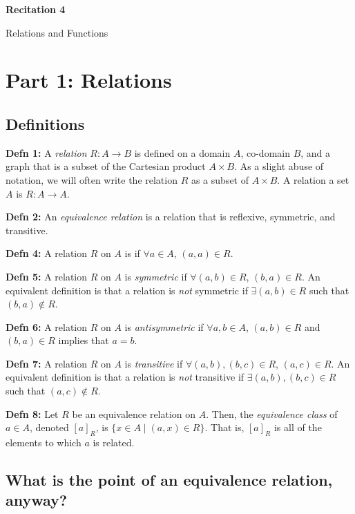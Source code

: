 \documentclass[12pt,letterpaper]{article}
\begin{document}
  \thispagestyle{firstpagestyle}
  \begin{center}
    {\large \textbf{Recitation 4}}
    
    {\large Relations and Functions}

  \end{center}

\section*{Part 1: Relations}

	\subsection*{Definitions}

\textbf{Defn 1:} A \textit{relation} $R:A \rightarrow B$ is defined on a domain $A$, co-domain $B$, and a graph that is a subset of the Cartesian product $A \times B$. As a slight abuse of notation, we will often write the relation $R$ as a subset of $A\times B$. A relation  a set $A$ is $R:A \rightarrow A$. 

\textbf{Defn 2:} An \textit{equivalence relation} is a relation that is reflexive, symmetric, and transitive.

\textbf{Defn 4:} A relation $R$ on $A$ is  if $\forall a \in A$, $(a, a) \in R$.

\textbf{Defn 5:} A relation $R$ on $A$ is \textit{symmetric} if $\forall (a, b) \in R$, $(b, a) \in R$. An equivalent definition is that a relation is \textit{not} symmetric if $ \exists (a, b) \in R$ such that $(b, a) \notin R$.

\textbf{Defn 6:} A relation $R$ on $A$ is \textit{antisymmetric} if $\forall a, b \in A$, $(a, b) \in R$ and $(b, a) \in R$ implies that $a = b$.

\textbf{Defn 7:} A relation $R$ on $A$ is \textit{transitive} if $\forall (a, b), (b, c) \in R$, $(a, c) \in R$. An equivalent definition is that a relation is \textit{not} transitive if $ \exists (a, b), (b, c) \in R$ such that $(a, c) \notin R$.

\textbf{Defn 8:} Let $R$ be an equivalence relation on $A$. Then, the \textit{equivalence class} of $a \in A$, denoted $\left[a\right]_R$,
is $\{x\in A \mid (a, x) \in R\}$. That is, 
$\left[a\right]_R$ is all of the elements to which $a$ is related.

\subsection*{What is the point of an equivalence relation, anyway?}
\end{document}
